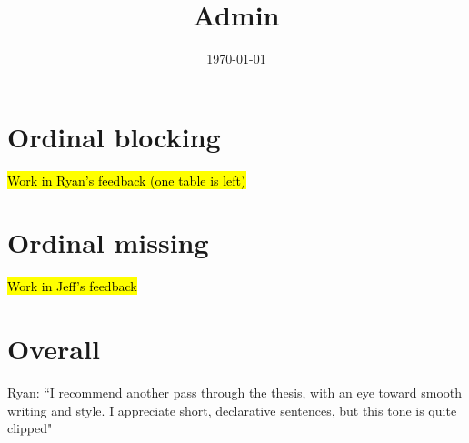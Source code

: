 \documentclass[12pt]{article}
\title{Admin}
\date{\today}
\begin{document}
\maketitle

\section*{Ordinal blocking}
	\begin{coi}
		\item \hl{Work in Ryan's feedback (one table is left)}
	\end{coi}
	
\section*{Ordinal missing}
	\begin{coi}
		\item \hl{Work in Jeff's feedback}
	\end{coi}
		
\section*{Overall}
	\begin{coi}
		\item Ryan: ``I recommend another pass through the thesis, with an eye toward smooth writing and style. I appreciate short, declarative sentences, but this tone is quite clipped"
	\end{coi}	
\end{document}
